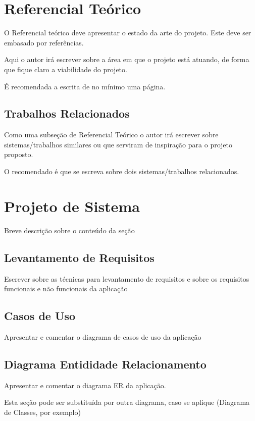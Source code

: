 \documentclass[12pt]{article}
\begin{document}
\section{Referencial Teórico}

O Referencial teórico deve apresentar o estado da arte do projeto. Este deve ser embasado por referências.

Aqui o autor irá escrever sobre a área em que o projeto está atuando, de forma que fique claro a viabilidade do projeto.

É recomendada a escrita de no mínimo uma página.

\subsection{Trabalhos Relacionados}

Como uma subseção de Referencial Teórico o autor irá escrever sobre sistemas/trabalhos similares ou que serviram de inspiração para o projeto proposto.

O recomendado é que se escreva sobre dois sistemas/trabalhos relacionados.

\section{Projeto de Sistema}

Breve descrição sobre o conteúdo da seção

\subsection{Levantamento de Requisitos}

Escrever sobre as técnicas para levantamento de requisitos e sobre os requisitos funcionais e não funcionais da aplicação

\subsection{Casos de Uso}

Apresentar e comentar o diagrama de casos de uso da aplicação

\subsection{Diagrama Entididade Relacionamento}

Apresentar e comentar o diagrama ER da aplicação.

Esta seção pode ser substituída por outra diagrama, caso se aplique (Diagrama de Classes, por exemplo)
\end{document}
